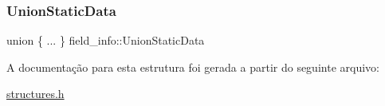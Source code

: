 \subsubsection{\texorpdfstring{Union\+Static\+Data}{UnionStaticData}}
{\footnotesize\ttfamily union \{ ... \}  field\+\_\+info\+::\+Union\+Static\+Data}



A documentação para esta estrutura foi gerada a partir do seguinte arquivo\+:\begin{DoxyCompactItemize}
\item 
\hyperlink{structures_8h}{structures.\+h}\end{DoxyCompactItemize}
